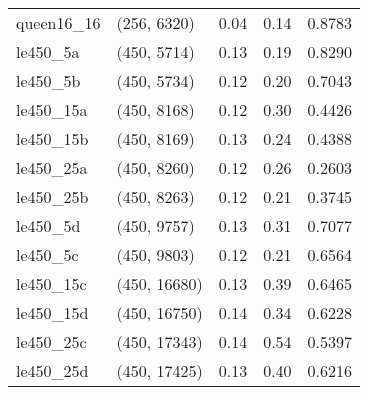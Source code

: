 \begin{tabular}{llrrr}
queen16\_16 &  (256, 6320) &      0.04 &     0.14 & 0.8783 \\
  le450\_5a &  (450, 5714) &      0.13 &     0.19 & 0.8290 \\
  le450\_5b &  (450, 5734) &      0.12 &     0.20 & 0.7043 \\
 le450\_15a &  (450, 8168) &      0.12 &     0.30 & 0.4426 \\
 le450\_15b &  (450, 8169) &      0.13 &     0.24 & 0.4388 \\
 le450\_25a &  (450, 8260) &      0.12 &     0.26 & 0.2603 \\
 le450\_25b &  (450, 8263) &      0.12 &     0.21 & 0.3745 \\
  le450\_5d &  (450, 9757) &      0.13 &     0.31 & 0.7077 \\
  le450\_5c &  (450, 9803) &      0.12 &     0.21 & 0.6564 \\
 le450\_15c & (450, 16680) &      0.13 &     0.39 & 0.6465 \\
 le450\_15d & (450, 16750) &      0.14 &     0.34 & 0.6228 \\
 le450\_25c & (450, 17343) &      0.14 &     0.54 & 0.5397 \\
 le450\_25d & (450, 17425) &      0.13 &     0.40 & 0.6216 \\
\bottomrule
\end{tabular}
